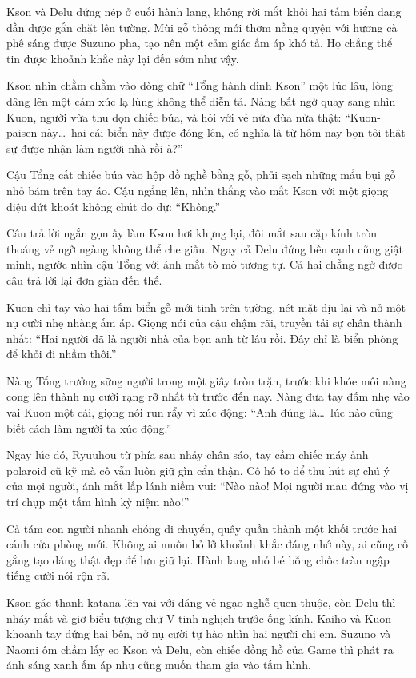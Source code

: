 ﻿\documentclass[../main.tex]{subfiles}
\begin{document}
Kson và Delu đứng nép ở cuối hành lang, không rời mắt khỏi hai tấm biển đang dần được gắn chặt lên tường. Mùi gỗ thông mới thơm nồng quyện với hương cà phê sáng được Suzuno pha, tạo nên một cảm giác ấm áp khó tả. Họ chẳng thể tin được khoảnh khắc này lại đến sớm như vậy.

Kson nhìn chằm chằm vào dòng chữ ``Tổng hành dinh Kson'' một lúc lâu, lòng dâng lên một cảm xúc lạ lùng không thể diễn tả. Nàng bất ngờ quay sang nhìn Kuon, người vừa thu dọn chiếc búa, và hỏi với vẻ nửa đùa nửa thật: ``Kuon-paisen này\dots\ hai cái biển này được đóng lên, có nghĩa là từ hôm nay bọn tôi thật sự được nhận làm người nhà rồi à?''

Cậu Tổng cất chiếc búa vào hộp đồ nghề bằng gỗ, phủi sạch những mẩu bụi gỗ nhỏ bám trên tay áo. Cậu ngẩng lên, nhìn thẳng vào mắt Kson với một giọng điệu dứt khoát không chút do dự: ``Không.''

Câu trả lời ngắn gọn ấy làm Kson hơi khựng lại, đôi mắt sau cặp kính tròn thoáng vẻ ngỡ ngàng không thể che giấu. Ngay cả Delu đứng bên cạnh cũng giật mình, ngước nhìn cậu Tổng với ánh mắt tò mò tương tự. Cả hai chẳng ngờ được câu trả lời lại đơn giản đến thế.

Kuon chỉ tay vào hai tấm biển gỗ mới tinh trên tường, nét mặt dịu lại và nở một nụ cười nhẹ nhàng ấm áp. Giọng nói của cậu chậm rãi, truyền tải sự chân thành nhất: ``Hai người đã là người nhà của bọn anh từ lâu rồi. Đây chỉ là biển phòng để khỏi đi nhầm thôi.''

Nàng Tổng trưởng sững người trong một giây tròn trặn, trước khi khóe môi nàng cong lên thành nụ cười rạng rỡ nhất từ trước đến nay. Nàng đưa tay đấm nhẹ vào vai Kuon một cái, giọng nói run rẩy vì xúc động: ``Anh đúng là\dots\ lúc nào cũng biết cách làm người ta xúc động.''

Ngay lúc đó, Ryuuhou từ phía sau nhảy chân sáo, tay cầm chiếc máy ảnh polaroid cũ kỹ mà cô vẫn luôn giữ gìn cẩn thận. Cô hô to để thu hút sự chú ý của mọi người, ánh mắt lấp lánh niềm vui: ``Nào nào! Mọi người mau đứng vào vị trí chụp một tấm hình kỷ niệm nào!''

Cả tám con người nhanh chóng di chuyển, quây quần thành một khối trước hai cánh cửa phòng mới. Không ai muốn bỏ lỡ khoảnh khắc đáng nhớ này, ai cũng cố gắng tạo dáng thật đẹp để lưu giữ lại. Hành lang nhỏ bé bỗng chốc tràn ngập tiếng cười nói rộn rã.

Kson gác thanh katana lên vai với dáng vẻ ngạo nghễ quen thuộc, còn Delu thì nháy mắt và giơ biểu tượng chữ V tinh nghịch trước ống kính. Kaiho và Kuon khoanh tay đứng hai bên, nở nụ cười tự hào nhìn hai người chị em. Suzuno và Naomi ôm chầm lấy eo Kson và Delu, còn chiếc đồng hồ của Game thì phát ra ánh sáng xanh ấm áp như cũng muốn tham gia vào tấm hình.
\end{document}
